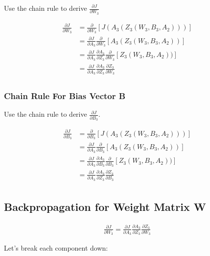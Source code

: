 \documentclass[openany]{book}
\begin{document}
Use the chain rule to derive \(\frac{\partial J}{\partial W_3}\)

\begin{align*}
\frac{\partial J}{\partial W_3} &= \frac{\partial}{\partial W_3}[J(A_3(Z_3(W_3, B_3, A_2)))] \\
&= \frac{\partial J}{\partial A_3} \frac{\partial}{\partial W_3}[A_3(Z_3(W_3, B_3, A_2))] \\
&= \frac{\partial J}{\partial A_3} \frac{\partial A_3}{\partial Z_3} \frac{\partial}{\partial W_3}[Z_3(W_3, B_3, A_2))] \\
&= \frac{\partial J}{\partial A_3} \frac{\partial A_3}{\partial Z_3} \frac{\partial Z_3}{\partial W_3} \\
\end{align*}

    \subsubsection{Chain Rule For Bias Vector
B}\label{chain-rule-for-bias-vector-b}

Use the chain rule to derive \(\frac{\partial J}{\partial B_3}\).

\begin{align*}
\frac{\partial J}{\partial B_3} &= \frac{\partial}{\partial B_3}[J(A_3(Z_3(W_3, B_3, A_2)))] \\
&= \frac{\partial J}{\partial A_3} \frac{\partial}{\partial B_3}[A_3(Z_3(W_3, B_3, A_2))] \\
&= \frac{\partial J}{\partial A_3} \frac{\partial A_3}{\partial B_3} \frac{\partial}{\partial B_3}[Z_3(W_3, B_3, A_2))] \\
&= \frac{\partial J}{\partial A_3} \frac{\partial A_3}{\partial Z_3} \frac{\partial Z_3}{\partial B_3} \\
\end{align*}

    \subsection{Backpropagation for Weight Matrix
W}\label{backpropagation-for-weight-matrix-w}

\begin{align*}
\frac{\partial J}{\partial W_3} = \frac{\partial J}{\partial A_3} \frac{\partial A_3}{\partial Z_3} \frac{\partial Z_3}{\partial W_3}
\end{align*}

Let's break each component down:
\end{document}
